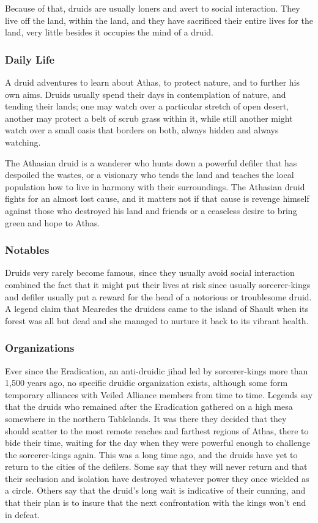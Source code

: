 Because of that, druids are usually loners and avert to social interaction. They live off the land, within the land, and they have sacrificed their entire lives for the land, very little besides it occupies the mind of a druid.

\subsubsection{Daily Life}
A druid adventures to learn about Athas, to protect nature, and to further his own aims. Druids usually spend their days in contemplation of nature, and tending their lands; one may watch over a particular stretch of open desert, another may protect a belt of scrub grass within it, while still another might watch over a small oasis that borders on both, always hidden and always watching.

The Athasian druid is a wanderer who hunts down a powerful defiler that has despoiled the wastes, or a visionary who tends the land and teaches the local population how to live in harmony with their surroundings. The Athasian druid fights for an almost lost cause, and it matters not if that cause is revenge himself against those who destroyed his land and friends or a ceaseless desire to bring green and hope to Athas.

\subsubsection{Notables}
Druids very rarely become famous, since they usually avoid social interaction combined the fact that it might put their lives at risk since usually sorcerer-kings and defiler usually put a reward for the head of a notorious or troublesome druid. A legend claim that Mearedes the druidess came to the island of Shault when its forest was all but dead and she managed to nurture it back to its vibrant health.

\subsubsection{Organizations}
Ever since the Eradication, an anti-druidic jihad led by sorcerer-kings more than 1,500 years ago, no specific druidic organization exists, although some form temporary alliances with Veiled Alliance members from time to time. Legends say that the druids who remained after the Eradication gathered on a high mesa somewhere in the northern Tablelands. It was there they decided that they should scatter to the most remote reaches and farthest regions of Athas, there to bide their time, waiting for the day when they were powerful enough to challenge the sorcerer-kings again. This was a long time ago, and the druids have yet to return to the cities of the defilers. Some say that they will never return and that their seclusion and isolation have destroyed whatever power they once wielded as a circle. Others say that the druid's long wait is indicative of their cunning, and that their plan is to insure that the next confrontation with the kings won't end in defeat.

